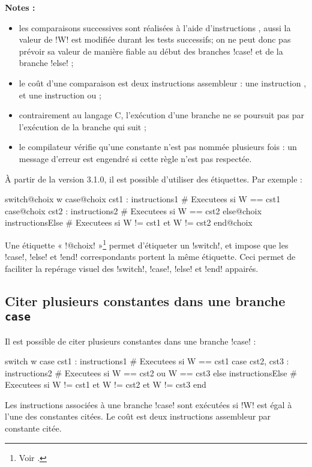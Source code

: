 \textbf{Notes :}
\begin{itemize}
  \item les comparaisons successives sont réalisées à l'aide d'instructions , aussi la valeur de \pic!W! est modifiée durant les tests successifs; on ne peut donc pas prévoir sa valeur de manière fiable au début des branches \pic!case! et de la branche \pic!else! ;
  \item le coût d'une comparaison est deux instructions assembleur : une instruction , et une instruction  ou   ;
  \item contrairement au langage C, l'exécution d'une branche ne se poursuit pas par l'exécution de la branche qui suit ;
  \item le compilateur vérifie qu'une constante n'est pas nommée plusieurs fois : un message d'erreur est engendré si cette règle n'est pas respectée.
\end{itemize}

À partir de la version 3.1.0, il est possible d'utiliser des étiquettes. Par exemple :
\begin{piccolo}
switch@choix w
case@choix cst1 :
  instructions1 # Executees si W == cst1
case@choix cst2 :
  instructions2 # Executees si W == cst2
else@choix
  instructionsElse # Executees si W != cst1 et W != cst2
end@choix
\end{piccolo}

Une étiquette « \pic!@choix! »\footnote{Voir .} permet d'étiqueter un \pic!switch!, et impose que les \pic!case!, \pic!else! et \pic!end! correspondants portent la même étiquette. Ceci permet de faciliter la repérage visuel des  \pic!switch!,  \pic!case!, \pic!else! et \pic!end! appairés.


\subsection{Citer plusieurs constantes dans une branche \texttt{case}}

Il est possible de citer plusieurs constantes dans une branche \pic!case! :
\begin{piccolo}
switch w
case cst1 :
  instructions1 # Executees si W == cst1
case cst2, cst3 :
  instructions2 # Executees si W == cst2 ou W == cst3
else
  instructionsElse # Executees si W != cst1 et W != cst2 et W != cst3
end
\end{piccolo}

Les instructions associées à une branche \pic!case! sont exécutées si \pic!W! est égal à l'une des constantes citées. Le coût est deux instructions assembleur par constante citée.


